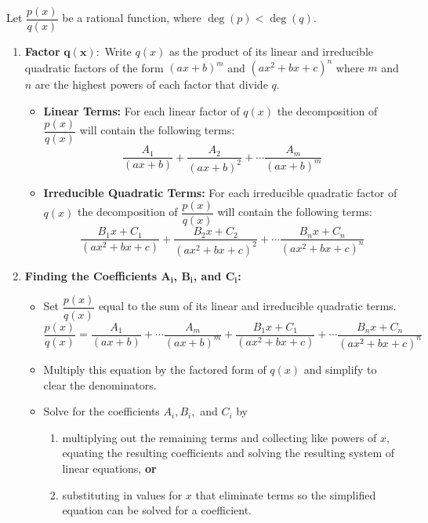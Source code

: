 {
\begin{keyidea}\label{idea:partial_fraction}
Let $\dfrac{p(x)}{q(x)}$ be a rational function, where $\deg(p)<\deg(q)$.
\begin{enumerate}
	\item \textbf {Factor} $\mathbf{q(x):}$ Write $q(x)$ as the product of its linear and irreducible quadratic factors of the form $(ax+b)^m$ and $(ax^2+bx+c)^n$ where $m$ and $n$ are the highest powers of each factor that divide $q$.
	\begin{itemize}
		\item \textbf{Linear Terms:} For each linear factor of $q(x)$ the decomposition of $\dfrac{p(x)}{q(x)}$ will contain the following terms:
		\[\frac{A_1}{(ax+b)}+\frac {A_2}{(ax+b)^2}+\dotsb\frac{A_m}{(ax+b)^m}\]
		\item \textbf{Irreducible Quadratic Terms:}  For each irreducible quadratic factor of $q(x)$ the decomposition of $\dfrac {p(x)}{q(x)}$ will contain the following terms:
		\[
		 \dfrac{B_1x+C_1}{(ax^2+bx+c)}+\frac{B_2x+C_2}{(ax^2+bx+c)^2}
		 +\dotsb\frac{B_nx+C_n}{(ax^2+bx+c)^n}
		\]
	\end{itemize}
	\item \textbf{Finding the Coefficients $\mathbf{A_i}$, $\mathbf{B_i}$, and $\mathbf{C_i}$:}
	\begin{itemize}
		\item Set $\dfrac{p(x)}{q(x)}$ equal to the sum of its linear and irreducible quadratic terms.
		\[
		 \frac{p(x)}{q(x)}
		 =\frac{A_1}{(ax+b)}+\dotsb\frac{A_m}{(ax+b)^m}
		 +\frac{B_1x+C_1}{(ax^2+bx+c)}+\dotsb\frac{B_nx+C_n}{(ax^2+bx+c)^n}
		\]
		\item Multiply this equation by the factored form of $q(x)$ and simplify to clear the denominators. 
		\item Solve for the coefficients $A_i, B_i,$ and $C_i$ by
		\begin{enumerate}
			\item multiplying out the remaining terms and collecting like powers of $x$, equating the resulting coefficients and solving the resulting system of linear equations, \textbf{or}
			\item substituting in values for $x$ that eliminate terms so the simplified equation can be solved for a coefficient.
		\end{enumerate}
	\end{itemize}
\end{enumerate}
\end{keyidea}
}

